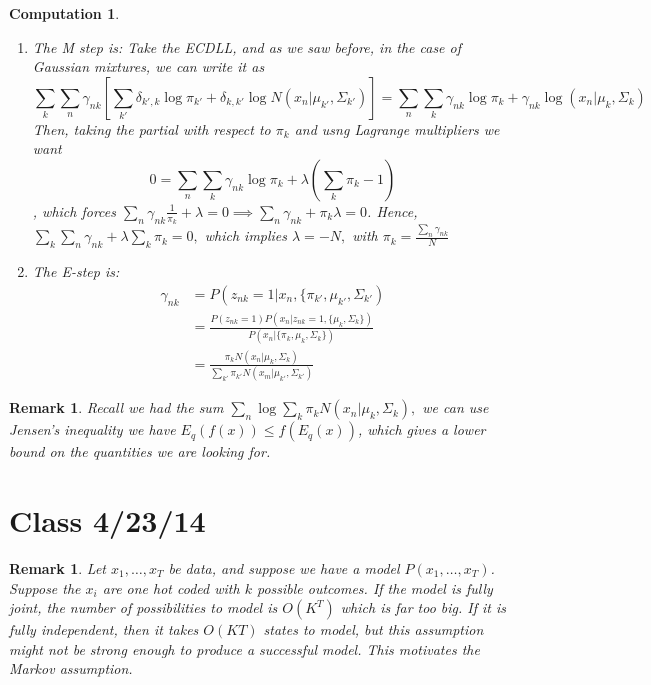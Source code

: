 \documentclass{amsart}
\newtheorem{comp}[subsubsection]{Computation}
\newtheorem{rem}[subsubsection]{Remark}
\begin{document}
\begin{comp}
\begin{enumerate}
	\item The M step is: Take the ECDLL, and as we saw before, in the case of Gaussian mixtures, we can write it as $$\sum_k \sum_n \gamma_{nk}\left[\sum_{k'} \delta_{k',k} \log 
\pi_{k'} + \delta_{k,k'} \log N(x_n|\mu_{k'},\Sigma_{k'}) \right]
= \sum_n \sum_k \gamma_{nk} \log \pi_k + \gamma_{nk} \log (x_n|\mu_k,\Sigma_k)$$ Then, taking the partial with respect to $\pi_k$ and usng Lagrange multipliers we want $$ 0 = \sum_n \sum_k \gamma_{nk} \log \pi_k + \lambda(\sum_k \pi_k - 1)$$, which forces $\sum_n \gamma_{nk} \frac{1}{\pi_k}+\lambda = 0 \implies \sum_n \gamma_{nk} + \pi_k \lambda = 0$. Hence, $\sum_k \sum_n \gamma_{nk} + \lambda \sum_k \pi_k = 0,$ which implies $\lambda = -N,$ with $\pi_k = \frac{\sum_n \gamma_{nk}}{N}$
	\item The E-step is:
	\begin{align*}
	\gamma_{nk} &= P(z_{nk}=1|x_n,\{\pi_{k'},\mu_{k'},\Sigma_{k'})
	\\
	&= \frac{P(z_{nk}=1)P(x_n|z_{nk}=1,\{\mu_k,\Sigma_k\})}{P(x_n|\{\pi_k,\mu_k,\Sigma_k\})}
	\\
	&= \frac{\pi_kN(x_n|\mu_k,\Sigma_k)}{\sum_{k'} \pi_{k'}N(x_m|\mu_{k'},\Sigma_{k'})}
\end{align*}
	
\end{enumerate}
\end{comp}

\begin{rem}
Recall we had the sum $\sum_n \log \sum_k \pi_k 
N(x_n|\mu_k,\Sigma_k),$ we can use Jensen's inequality we have
$E_q(f(x)) \leq f (E_q(x))$, which gives a lower bound on the quantities we are looking for.
\end{rem}

\section{Class 4/23/14}


\begin{rem}
Let $x_1,\ldots,x_T$ be data, and suppose we have a model $P(x_1,\ldots,x_T)$. Suppose the $x_i$ are one hot coded with $k$ possible outcomes. If the model is fully joint, the number of possibilities to model is $O(K^T)$ which is far too big. If it is fully independent, then it takes $O(KT)$ states to model, but this assumption might not be strong enough to produce a successful model. This motivates the Markov assumption.
\end{rem}
\end{document}
